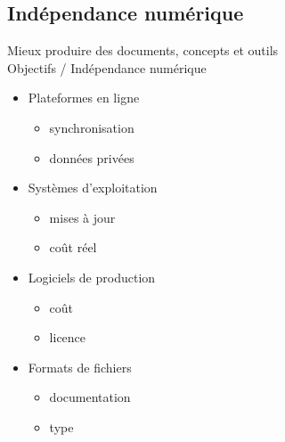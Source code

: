 \documentclass{beamer}
\def\hititle{Mieux produire des documents}
\def\lotitle{concepts et outils}
\def\fulltitle{\hititle, \lotitle}
\begin{document}
\subsection{Indépendance numérique}
\begin{frame}{\fulltitle\\Objectifs / Indépendance numérique}
\begin{itemize}
\item<1-> Plateformes en ligne
    \begin{itemize}
    \item<2-> synchronisation
    \item<3-> données privées
    \end{itemize}
\item<4-> Systèmes d’exploitation
    \begin{itemize}
    \item<5-> mises à jour
    \item<6-> coût réel
    \end{itemize}
\item<7-> Logiciels de production
    \begin{itemize}
    \item<8-> coût
    \item<9-> licence
    \end{itemize}
\item<10-> Formats de fichiers
    \begin{itemize}
    \item<11-> documentation
    \item<12-> type
    \end{itemize}
\end{itemize}
\end{frame}
\end{document}
